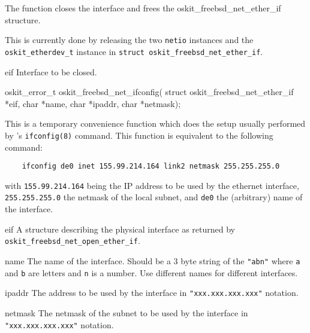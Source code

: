 \begin{apidesc}
	The function closes the interface and frees 
	the oskit_freebsd_net_ether_if structure.

	This is currently done by releasing the two \texttt{netio}
	instances and the \texttt{oskit_etherdev_t} instance in 
	\texttt{struct oskit_freebsd_net_ether_if}.
	
\end{apidesc}

\begin{apiparm}
	\item[eif] Interface to be closed.
\end{apiparm}


%
%

\begin{apisyn}

        \funcproto oskit_error_t  
	oskit_freebsd_net_ifconfig(
		struct oskit_freebsd_net_ether_if *eif,
		char *name, char *ipaddr, char *netmask);
\end{apisyn}
\ostonet

\begin{apidesc}
	This is a temporary convenience function which does the
	setup usually performed by \freebsd{}'s \texttt{ifconfig(8)} command.
	This function is equivalent to the following command:
	\begin{verbatim}
	ifconfig de0 inet 155.99.214.164 link2 netmask 255.255.255.0
	\end{verbatim}
	with \texttt{155.99.214.164} being the IP address to be used
	by the ethernet interface, \texttt{255.255.255.0} the
	netmask of the local subnet, and \texttt{de0} the
	(arbitrary) name of the interface. 

	
\end{apidesc}

\begin{apiparm}
	\item[eif] A structure describing the physical interface 
	as returned by \texttt{oskit_freebsd_net_open_ether_if}.
	
	\item[name] The name of the interface. Should be a 3 byte string 
	of the \texttt{"abn"} where \texttt{a} and \texttt{b} are letters
	and \texttt{n} is a number. Use different names for different
	interfaces.

	\item[ipaddr]
	The address to be used by the interface in \texttt{"xxx.xxx.xxx.xxx"}
	notation.
	
	\item[netmask]
	The netmask of the subnet to be used by the interface 
	in \texttt{"xxx.xxx.xxx.xxx"} notation.
\end{apiparm}

